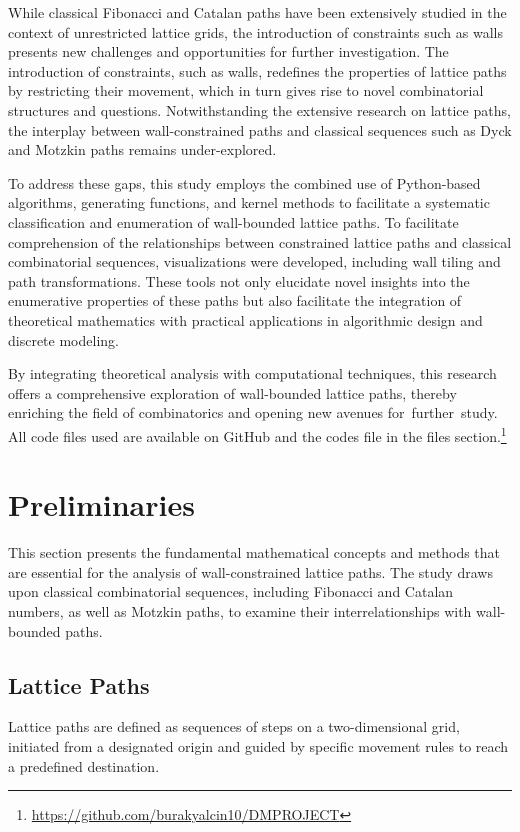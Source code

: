 \documentclass{article}
\begin{document}
While classical Fibonacci and Catalan paths have been extensively studied in the context of unrestricted lattice grids, the introduction of constraints such as walls presents new challenges and opportunities for further investigation. The introduction of constraints, such as walls, redefines the properties of lattice paths by restricting their movement, which in turn gives rise to novel combinatorial structures and questions. Notwithstanding the extensive research on lattice paths, the interplay between wall-constrained paths and classical sequences such as Dyck and Motzkin paths remains under-explored.

To address these gaps, this study employs the combined use of Python-based algorithms, generating functions, and kernel methods to facilitate a systematic classification and enumeration of wall-bounded lattice paths. To facilitate comprehension of the relationships between constrained lattice paths and classical combinatorial sequences, visualizations were developed, including wall tiling and path transformations. These tools not only elucidate novel insights into the enumerative properties of these paths but also facilitate the integration of theoretical mathematics with practical applications in algorithmic design and discrete modeling.

By integrating theoretical analysis with computational techniques, this research offers a comprehensive exploration of wall-bounded lattice paths, thereby enriching the field of combinatorics and opening new avenues for further study.
All code files used are available on GitHub and the codes file in the files section.\footnote{\url{https://github.com/burakyalcin10/DMPROJECT}}

\section{Preliminaries}

This section presents the fundamental mathematical concepts and methods that are essential for the analysis of wall-constrained lattice paths. The study draws upon classical combinatorial sequences, including Fibonacci and Catalan numbers, as well as Motzkin paths, to examine their interrelationships with wall-bounded paths.

\subsection{Lattice Paths}
Lattice paths are defined as sequences of steps on a two-dimensional grid, initiated from a designated origin and guided by specific movement rules to reach a predefined destination. 
\end{document}

